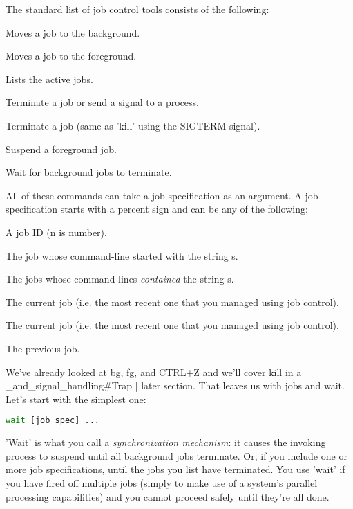 The standard list of job control tools consists of the following:

\begin{description}
\setlength{\leftmargin}{0pt}
\setlength{\itemsep}{0pt}
\setlength{\parsep}{0pt}
\setlength{\parskip}{0pt}
\item[bg]Moves a job to the background.
\item[fg]Moves a job to the foreground.
\item[jobs]Lists the active jobs.
\item[kill]Terminate a job or send a signal to a process.
\item[CTRL+C]Terminate a job (same as 'kill' using the SIGTERM signal).
\item[CRTL+Z]Suspend a foreground job.
\item[wait]Wait for background jobs to terminate.
\end{description}

All of these commands can take a job specification as an argument. A job
specification starts with a percent sign and can be any of the following:

\begin{description}
\setlength{\leftmargin}{0pt}
\setlength{\itemsep}{0pt}
\setlength{\parsep}{0pt}
\setlength{\parskip}{0pt}
\item[\%n]A job ID (n is  number).
\item[\%s]The job whose command-line started with the string s.
\item[\%?s]The jobs whose command-lines \textit{contained} the string s.
\item[\%\%]The current job (i.e. the most recent one that you managed using job control).
\item[\%+]The current job (i.e. the most recent one that you managed using job control).
\item[\%-]The previous job.
\end{description}

We've already looked at bg, fg, and CTRL+Z and we'll cover kill in a
\_and\_signal\_handling\#Trap | later section. That leaves us with jobs and
wait. Let's start with the simplest one:
\lstset{basicstyle=\scriptsize, numbers=left, captionpos=b, tabsize=4}
\begin{lstlisting}[caption=job wait,language={bash},
xleftmargin=15pt,label=lst:jobwait]
wait [job spec] ...
\end{lstlisting}

'Wait' is what you call a \textit{synchronization mechanism}: it causes the
invoking process to suspend until all background jobs terminate. Or, if you
include one or more job specifications, until the jobs you list have
terminated. You use 'wait' if you have fired off multiple jobs (simply to make
use of a system's parallel processing capabilities) and you cannot proceed
safely until they're all done.

